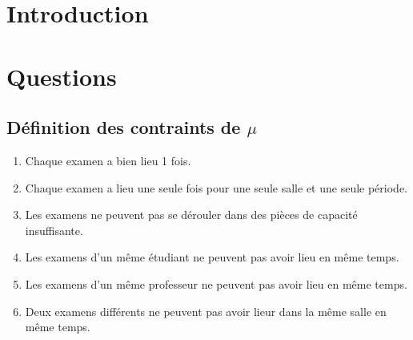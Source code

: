\documentclass[a4paper,10pt]{article}
\begin{document}
\section{Introduction}
\section{Questions}
\subsection{Définition des contraints de $\mu$}
\begin{enumerate}
\item
Chaque examen a bien lieu 1 fois.
\item
Chaque examen a lieu une seule fois pour une seule salle et une seule période.
\item
Les examens ne peuvent pas se dérouler dans des pièces de capacité insuffisante.
\item
Les examens d'un même étudiant ne peuvent pas avoir lieu en même temps.
\item
Les examens d'un même professeur ne peuvent pas avoir lieu en même temps.
\item
Deux examens différents ne peuvent pas avoir lieur dans la même salle en même temps.
\end{enumerate}
\end{document}
